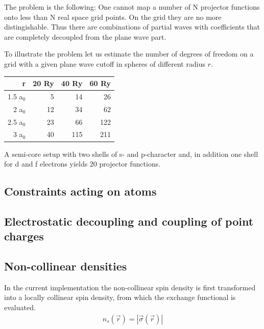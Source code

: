 \documentclass[final,12pt]{article}
\begin{document}
{{{{{{The problem is the following: One cannot map a number of N projector
functions onto less than N real space grid points. On the grid they
are no more distingishable. Thus there are combinations of partial
waves with coefficients that are completely decoupled from the plane
wave part. 

To illustrate the problem let us estimate the number of degrees of
freedom on a grid with a given plane wave cutoff in spheres of
different radius $r$.

\begin{center}
\begin{tabular}{|r|r|r|r|}
\hline
r      & 20 Ry & 40 Ry & 60 Ry \\
\hline
1.5 a$_0$ &  5 &  14 &  26 \\
2   a$_0$& 12 &  34 &  62 \\
2.5 a$_0$& 23 &  66 &  122\\
3   a$_0$& 40 & 115 & 211 \\
\hline
\end{tabular}
\end{center}

A semi-core setup with two shells of s- and p-character and, in
addition one shell for d and f electrons yields 20 projector
functions.




\subsection{Constraints acting on atoms}


\subsection{Electrostatic decoupling and coupling of point charges}

\subsection{Non-collinear densities}
\label{sec:noncollinear}
In the current implementation the non-collinear spin density is first
transformed into a locally collinear spin density, from which the
exchange functional is evaluated. 
\begin{eqnarray*}
n_s(\vec{r})= |\vec{\sigma}(\vec{r})|
\end{eqnarray*}

}}}}}}
\end{document}
